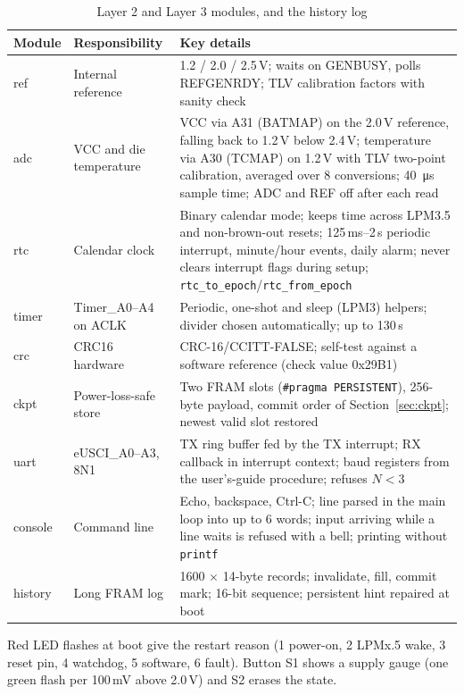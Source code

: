 \documentclass[11pt,a4paper]{article}
\newcommand{\code}[1]{\texttt{#1}}
\begin{document}
\begin{table}[H]
\centering\small
\caption{Layer 2 and Layer 3 modules, and the history log}
\begin{tabularx}{\textwidth}{@{}llL@{}}
\toprule
Module & Responsibility & Key details \\
\midrule
ref & Internal reference & 1.2 / 2.0 / 2.5\,V; waits on GENBUSY, polls REFGENRDY; TLV calibration factors with sanity check \\
adc & VCC and die temperature & VCC via A31 (BATMAP) on the 2.0\,V reference, falling back to 1.2\,V below 2.4\,V; temperature via A30 (TCMAP) on 1.2\,V with TLV two-point calibration, averaged over 8 conversions; \SI{40}{\micro\second} sample time; ADC and REF off after each read \\
rtc & Calendar clock & Binary calendar mode; keeps time across LPM3.5 and non-brown-out resets; 125\,ms--2\,s periodic interrupt, minute/hour events, daily alarm; never clears interrupt flags during setup; \code{rtc\_to\_epoch}/\code{rtc\_from\_epoch} \\
timer & Timer\_A0--A4 on ACLK & Periodic, one-shot and sleep (LPM3) helpers; divider chosen automatically; up to 130\,s \\
crc & CRC16 hardware & CRC-16/CCITT-FALSE; self-test against a software reference (check value 0x29B1) \\
ckpt & Power-loss-safe store & Two FRAM slots (\code{\#pragma PERSISTENT}), 256-byte payload, commit order of Section~\ref{sec:ckpt}; newest valid slot restored \\
uart & eUSCI\_A0--A3, 8N1 & TX ring buffer fed by the TX interrupt; RX callback in interrupt context; baud registers from the user's-guide procedure; refuses $N<3$ \\
console & Command line & Echo, backspace, Ctrl-C; line parsed in the main loop into up to 6 words; input arriving while a line waits is refused with a bell; printing without \code{printf} \\
history & Long FRAM log & 1600 $\times$ 14-byte records; invalidate, fill, commit mark; 16-bit sequence; persistent hint repaired at boot \\
\bottomrule
\end{tabularx}
\end{table}

Red LED flashes at boot give the restart reason (1 power-on, 2 LPMx.5 wake, 3 reset pin, 4 watchdog, 5 software, 6 fault). Button S1 shows a supply gauge (one green flash per 100\,mV above 2.0\,V) and S2 erases the state.
\end{document}
